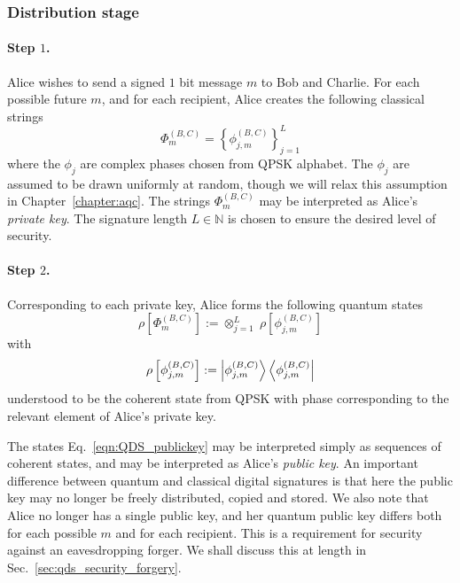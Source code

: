 
\subsubsection{Distribution stage}

\paragraph{Step $1$.}
Alice wishes to send a signed $1$ bit message $m$ to Bob and Charlie. For each possible future $m$, and for each recipient, Alice creates the following classical strings
\begin{equation}
\Phi_m^{\left(B, C\right)} = \left\{ \phi_{j, m}^{\left(B, C\right)}\right\}_{j=1}^{L}
\end{equation}
where the $\phi_{j}$ are complex phases chosen from QPSK alphabet. The $\phi_j$ are assumed to be drawn uniformly at random, though we will relax this assumption in Chapter~\ref{chapter:aqc}. The strings $\Phi_m^{\left(B, C\right)}$ may be interpreted as Alice's \emph{private key}. The signature length $L \in \mathbb{N}$ is chosen to ensure the desired level of security.

\paragraph{Step $2$.} Corresponding to each private key, Alice forms the following quantum states
\begin{equation}\label{eqn:QDS_publickey}
\rho\left[\Phi_m^{\left(B, C\right)}\right] := \otimes_{j=1}^L \; \rho\left[\phi_{j, m}^{\left(B, C\right)}\right]
\end{equation}
with
\begin{equation}
\rho\left[\phi_{j, m}^{\left(B, C\right)}\right] := \ket{\phi_{j, m}^{\left(B, C\right)}} \bra{\phi_{j, m}^{\left(B, C\right)}} \notag
\end{equation}
understood to be the coherent state from QPSK with phase corresponding to the relevant element of Alice's private key.

The states Eq.~\ref{eqn:QDS_publickey} may be interpreted simply as sequences of coherent states, and may be interpreted as Alice's \emph{public key}. An important difference between quantum and classical digital signatures is that here the public key may no longer be freely distributed, copied and stored. We also note that Alice no longer has a single public key, and her quantum public key differs both for each possible $m$ and for each recipient. This is a requirement for security against an eavesdropping forger. We shall discuss this at length in Sec.~\ref{sec:qds_security_forgery}. 
